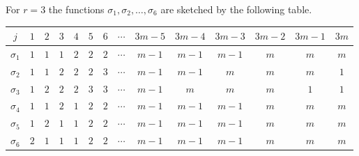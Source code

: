 \begin{example} \label{exa:sigmaCase3}
	For $r = 3$ the functions $\sigma_1, \sigma_2, \ldots, \sigma_6$ are sketched by the following table.
	\begin{center}
		\begin{tabular}{|c||c|c|c|c|c|c|c|c|c|c|c|c|c|}
			\hline 
			$j$ & $1$ & $2$ & $3$ & $4$ & $5$ & $6$ & $\cdots$ & $3m -5$ & $3m - 4$ & $3m-3$ & $3m -2$ & $3m - 1$ & $3m$ \\ 
			\hline \hline
			$\sigma_1$ & \cellcolor{cyan}$1$ & \cellcolor{cyan}$1$ & \cellcolor{cyan}$1$ & \cellcolor{Yellow}$2$ & \cellcolor{Yellow}$2$ & \cellcolor{Yellow}$2$ & $\cdots$ & \cellcolor{YellowGreen}$m-1$ & \cellcolor{YellowGreen}$m-1$ & \cellcolor{YellowGreen}$m-1$ & \cellcolor{YellowOrange}$m$ & \cellcolor{YellowOrange}$m$ & \cellcolor{YellowOrange}$m$ \\
			\hline 
			$\sigma_2$ & \cellcolor{cyan}$1$ & \cellcolor{cyan}$1$ & \cellcolor{Yellow}$2$ & \cellcolor{Yellow}$2$ & \cellcolor{Yellow}$2$ & \cellcolor{Tan!70}$3$ & $\cdots$ & \cellcolor{YellowGreen}$m-1$ & \cellcolor{YellowGreen}$m-1$ & \cellcolor{YellowOrange}$m$ & \cellcolor{YellowOrange}$m$ & \cellcolor{YellowOrange}$m$ & \cellcolor{cyan}$1$ \\ 
			\hline 
			$\sigma_3$ & \cellcolor{cyan}$1$ & \cellcolor{Yellow}$2$ & \cellcolor{Yellow}$2$ & \cellcolor{Yellow}$2$ & \cellcolor{Tan!70}$3$ & \cellcolor{Tan!70}$3$ & $\cdots$ & \cellcolor{YellowGreen}$m-1$ & \cellcolor{YellowOrange}$m$ & \cellcolor{YellowOrange}$m$ & \cellcolor{YellowOrange}$m$ & \cellcolor{cyan}$1$ & \cellcolor{cyan}$1$ \\ 
			\hline \hline
			$\sigma_4$ & \cellcolor{cyan}$1$ & \cellcolor{cyan}$1$ & \cellcolor{Yellow}$2$ & \cellcolor{cyan}$1$ & \cellcolor{Yellow}$2$ & \cellcolor{Yellow}$2$ & $\cdots$ & \cellcolor{YellowGreen}$m-1$ & \cellcolor{YellowGreen}$m-1$ & \cellcolor{YellowGreen}$m-1$ & \cellcolor{YellowOrange}$m$ & \cellcolor{YellowOrange}$m$ & \cellcolor{YellowOrange}$m$ \\  
			\hline 
			$\sigma_5$ & \cellcolor{cyan}$1$ & \cellcolor{Yellow}$2$ & \cellcolor{cyan}$1$ & \cellcolor{cyan}$1$ & \cellcolor{Yellow}$2$ & \cellcolor{Yellow}$2$ & $\cdots$ & \cellcolor{YellowGreen}$m-1$ & \cellcolor{YellowGreen}$m-1$ & \cellcolor{YellowGreen}$m-1$ & \cellcolor{YellowOrange}$m$ & \cellcolor{YellowOrange}$m$ & \cellcolor{YellowOrange}$m$ \\ 
			\hline
			$\sigma_6$ & \cellcolor{Yellow}$2$ & \cellcolor{cyan}$1$ & \cellcolor{cyan}$1$ & \cellcolor{cyan}$1$ & \cellcolor{Yellow}$2$ & \cellcolor{Yellow}$2$ & $\cdots$ & \cellcolor{YellowGreen}$m-1$ & \cellcolor{YellowGreen}$m-1$ & \cellcolor{YellowGreen}$m-1$ & \cellcolor{YellowOrange}$m$ & \cellcolor{YellowOrange}$m$ & \cellcolor{YellowOrange}$m$ \\ 

\end{tabular}
\end{center}
\end{example}
